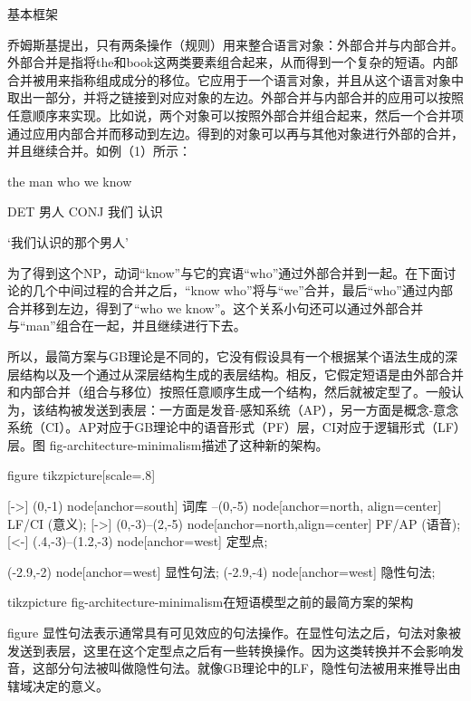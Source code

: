 基本框架


乔姆斯基提出，只有两条操作（规则）用来整合语言对象：外部合并与内部合并。外部合并是指将the和book这两类要素组合起来，从而得到一个复杂的短语。内部合并被用来指称组成成分的移位。它应用于一个语言对象，并且从这个语言对象中取出一部分，并将之链接到对应对象的左边。外部合并与内部合并的应用可以按照任意顺序来实现。比如说，两个对象可以按照外部合并组合起来，然后一个合并项通过应用内部合并而移动到左边。得到的对象可以再与其他对象进行外部的合并，并且继续合并。如例（1）所示：









the man who we know

DET 男人 CONJ 我们 认识

`我们认识的那个男人'

为了得到这个NP，动词“know”与它的宾语“who”通过外部合并到一起。在下面讨论的几个中间过程的合并之后，“know who”将与“we”合并，最后“who”通过内部合并移到左边，得到了“who we know”。这个关系小句还可以通过外部合并与“man”组合在一起，并且继续进行下去。






所以，最简方案与GB理论是不同的，它没有假设具有一个根据某个语法生成的深层结构以及一个通过从深层结构生成的表层结构。相反，它假定短语是由外部合并和内部合并（组合与移位）按照任意顺序生成一个结构，然后就被定型了。一般认为，该结构被发送到表层：一方面是发音-感知系统（AP），另一方面是概念-意念系统（CI）。AP对应于GB理论中的语音形式（PF）层，CI对应于逻辑形式（LF）层。图 fig-architecture-minimalism描述了这种新的架构。








figure
tikzpicture[scale=.8]

[->] (0,-1) node[anchor=south] 词库 --(0,-5) node[anchor=north, align=center] LF/CI
(意义);
[->] (0,-3)--(2,-5) node[anchor=north,align=center] PF/AP
(语音);
[<-] (.4,-3)--(1.2,-3) node[anchor=west] 定型点;

(-2.9,-2) node[anchor=west] 显性句法;
(-2.9,-4) node[anchor=west] 隐性句法;








tikzpicture
fig-architecture-minimalism在短语模型之前的最简方案的架构


figure
显性句法表示通常具有可见效应的句法操作。在显性句法之后，句法对象被发送到表层，这里在这个定型点之后有一些转换操作。因为这类转换并不会影响发音，这部分句法被叫做隐性句法。就像GB理论中的LF，隐性句法被用来推导出由辖域决定的意义。






